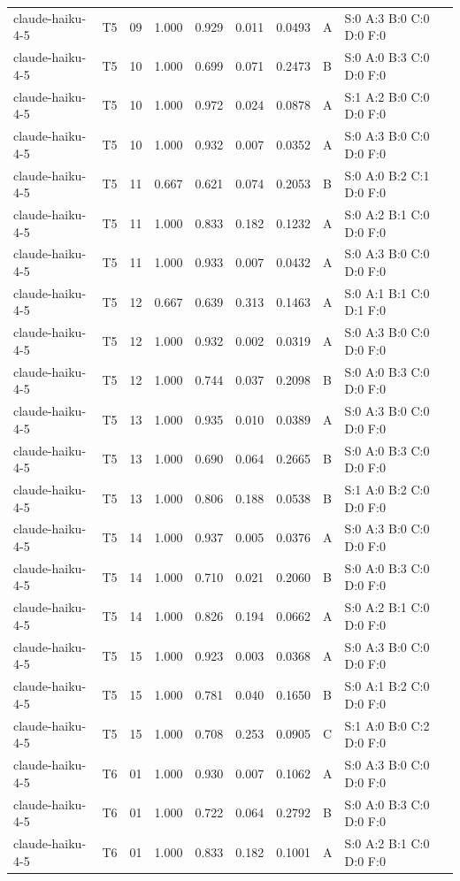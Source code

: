 \begin{longtable}{llrrrrrll}
claude-haiku-4-5 & T5 & 09 & 1.000 & 0.929 & 0.011 & 0.0493 & A & \tiny S:0 A:3 B:0 C:0 D:0 F:0 \\
claude-haiku-4-5 & T5 & 10 & 1.000 & 0.699 & 0.071 & 0.2473 & B & \tiny S:0 A:0 B:3 C:0 D:0 F:0 \\
claude-haiku-4-5 & T5 & 10 & 1.000 & 0.972 & 0.024 & 0.0878 & A & \tiny S:1 A:2 B:0 C:0 D:0 F:0 \\
claude-haiku-4-5 & T5 & 10 & 1.000 & 0.932 & 0.007 & 0.0352 & A & \tiny S:0 A:3 B:0 C:0 D:0 F:0 \\
claude-haiku-4-5 & T5 & 11 & 0.667 & 0.621 & 0.074 & 0.2053 & B & \tiny S:0 A:0 B:2 C:1 D:0 F:0 \\
claude-haiku-4-5 & T5 & 11 & 1.000 & 0.833 & 0.182 & 0.1232 & A & \tiny S:0 A:2 B:1 C:0 D:0 F:0 \\
claude-haiku-4-5 & T5 & 11 & 1.000 & 0.933 & 0.007 & 0.0432 & A & \tiny S:0 A:3 B:0 C:0 D:0 F:0 \\
claude-haiku-4-5 & T5 & 12 & 0.667 & 0.639 & 0.313 & 0.1463 & A & \tiny S:0 A:1 B:1 C:0 D:1 F:0 \\
claude-haiku-4-5 & T5 & 12 & 1.000 & 0.932 & 0.002 & 0.0319 & A & \tiny S:0 A:3 B:0 C:0 D:0 F:0 \\
claude-haiku-4-5 & T5 & 12 & 1.000 & 0.744 & 0.037 & 0.2098 & B & \tiny S:0 A:0 B:3 C:0 D:0 F:0 \\
claude-haiku-4-5 & T5 & 13 & 1.000 & 0.935 & 0.010 & 0.0389 & A & \tiny S:0 A:3 B:0 C:0 D:0 F:0 \\
claude-haiku-4-5 & T5 & 13 & 1.000 & 0.690 & 0.064 & 0.2665 & B & \tiny S:0 A:0 B:3 C:0 D:0 F:0 \\
claude-haiku-4-5 & T5 & 13 & 1.000 & 0.806 & 0.188 & 0.0538 & B & \tiny S:1 A:0 B:2 C:0 D:0 F:0 \\
claude-haiku-4-5 & T5 & 14 & 1.000 & 0.937 & 0.005 & 0.0376 & A & \tiny S:0 A:3 B:0 C:0 D:0 F:0 \\
claude-haiku-4-5 & T5 & 14 & 1.000 & 0.710 & 0.021 & 0.2060 & B & \tiny S:0 A:0 B:3 C:0 D:0 F:0 \\
claude-haiku-4-5 & T5 & 14 & 1.000 & 0.826 & 0.194 & 0.0662 & A & \tiny S:0 A:2 B:1 C:0 D:0 F:0 \\
claude-haiku-4-5 & T5 & 15 & 1.000 & 0.923 & 0.003 & 0.0368 & A & \tiny S:0 A:3 B:0 C:0 D:0 F:0 \\
claude-haiku-4-5 & T5 & 15 & 1.000 & 0.781 & 0.040 & 0.1650 & B & \tiny S:0 A:1 B:2 C:0 D:0 F:0 \\
claude-haiku-4-5 & T5 & 15 & 1.000 & 0.708 & 0.253 & 0.0905 & C & \tiny S:1 A:0 B:0 C:2 D:0 F:0 \\
claude-haiku-4-5 & T6 & 01 & 1.000 & 0.930 & 0.007 & 0.1062 & A & \tiny S:0 A:3 B:0 C:0 D:0 F:0 \\
claude-haiku-4-5 & T6 & 01 & 1.000 & 0.722 & 0.064 & 0.2792 & B & \tiny S:0 A:0 B:3 C:0 D:0 F:0 \\
claude-haiku-4-5 & T6 & 01 & 1.000 & 0.833 & 0.182 & 0.1001 & A & \tiny S:0 A:2 B:1 C:0 D:0 F:0 \\
\end{longtable}
